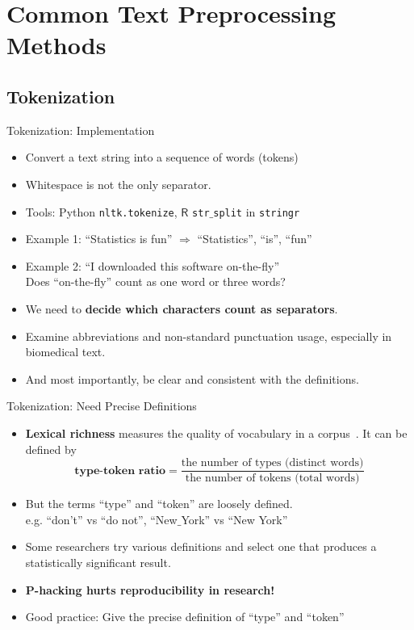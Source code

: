 \documentclass{beamer}
\renewcommand{\cite}{\citep}
\begin{document}
\section{Common Text Preprocessing Methods}


\subsection{Tokenization}

\begin{frame}{Tokenization: Implementation}
\begin{itemize}
\item Convert a text string into a sequence of words (tokens)
\item Whitespace is not the only separator.~\cite{clough2001perl}
\item Tools: Python \texttt{nltk.tokenize}, $\mathsf{R}$ \texttt{str$\_$split} in \texttt{stringr} 
	\bigskip
\item Example 1: ``Statistics is fun'' $\Rightarrow$ ``Statistics'', ``is'', ``fun''
\item Example 2: ``I downloaded this software on-the-fly''\\
	Does ``on-the-fly'' count as one word or three words?
	\bigskip
\item We need to \textbf{decide which characters count as separators}.
\item Examine abbreviations and non-standard punctuation usage, especially in biomedical text.~\cite{diaz2015analysis}
\item And most importantly, be clear and consistent with the definitions.
\end{itemize}
\end{frame}

\begin{frame}{Tokenization: Need Precise Definitions}
\begin{itemize}
\item \textbf{Lexical richness} measures the quality of vocabulary in a corpus~\cite{malvern2012measures}. It can be defined by
$$\textbf{type-token ratio} =  \dfrac{\text{the number of types (distinct words)}}{\text{the number of tokens (total words)}}$$
\item But the terms ``type'' and ``token'' are loosely defined.\\
e.g. ``don't'' vs ``do not'', ``New$\_$York'' vs ``New York''
	\bigskip
\item Some researchers try various definitions and select one that produces a statistically significant result.~\cite{cohen2019p-hacking}
\item\textbf{P-hacking hurts reproducibility in research!}~\cite{head2015extent}
\item Good practice: Give the precise definition of ``type'' and ``token''
\end{itemize}
\end{frame}
\end{document}
